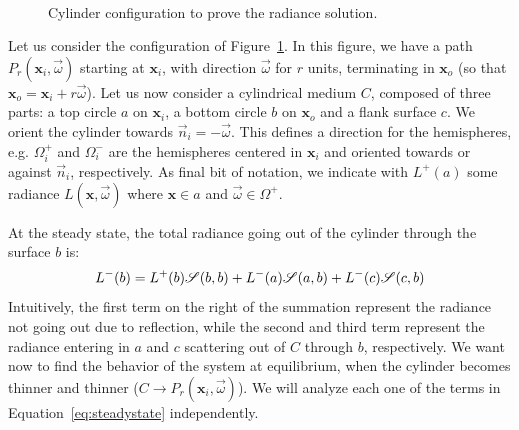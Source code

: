 \begin{figure}
\centering
   \def\svgwidth{0.8\textwidth}
    \\
\caption{Cylinder configuration to prove the radiance solution.} %
\label{fig:cylinder}
\end{figure}

Let us consider the configuration of Figure~\ref{fig:cylinder}. In this figure, we have a path $P_r(\mathbf{x}_i,\vec{\omega})$ starting at $\mathbf{x}_i$, with direction $\vec{\omega}$ for $r$ units, terminating in $\mathbf{x}_o$ (so that $\mathbf{x}_o = \mathbf{x}_i + r \vec{\omega}$). Let us now consider a cylindrical medium $C$, composed of three parts: a top circle $a$ on $\mathbf{x}_i$, a bottom circle $b$ on $\mathbf{x}_o$ and a flank surface $c$. We orient the cylinder towards $\vec{n}_i = -\vec{\omega}$. This defines a direction for the hemispheres, e.g. $\Omega_i^+$ and $\Omega_i^-$ are the hemispheres centered in $\mathbf{x}_i$  and oriented towards or against $\vec{n}_i$, respectively. As final bit of notation, we indicate with $L^+(a)$ some radiance $L(\mathbf{x}, \vec{\omega})$ where $\mathbf{x} \in a$ and $\vec{\omega} \in \Omega^+$.

At the steady state, the total radiance going out of the cylinder through the surface $b$ is:
\begin{equation}
\label{eq:steadystate}
L^-(b) = L^+(b)\mathscr{S}(b,b) + L^-(a)\mathscr{S}(a,b)  + L^-(c)\mathscr{S}(c,b)
\end{equation}
Intuitively, the first term on the right of the summation represent the radiance not going out due to reflection, while the second and third term represent the radiance entering in $a$ and $c$ scattering out of $C$ through $b$, respectively. We want now to find the behavior of the system at equilibrium, when the cylinder becomes thinner and thinner ($C\rightarrow P_r(\mathbf{x}_i,\vec{\omega})$). We will analyze each one of the terms in Equation~\ref{eq:steadystate} independently. 

